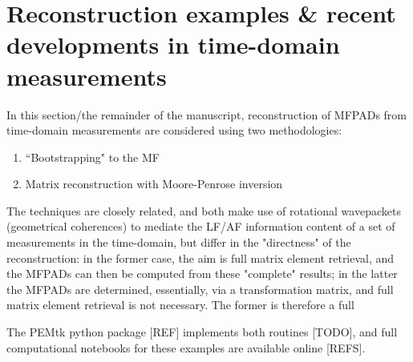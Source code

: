 \section{Reconstruction examples \& recent developments in time-domain measurements}

In this section/the remainder of the manuscript, reconstruction of MFPADs from time-domain measurements are considered using two methodologies:

\begin{enumerate}
\item ``Bootstrapping" to the MF \cite{hockett2018QMP1,hockett2018QMP2,marceau2017MolecularFrameReconstruction}
\item Matrix reconstruction with Moore-Penrose inversion \cite{gregory2021MolecularFramePhotoelectron}
\end{enumerate}

The techniques are closely related, and both make use of rotational wavepackets (geometrical coherences) to mediate the LF/AF information content of a set of measurements in the time-domain, but differ in the "directness" of the reconstruction: in the former case, the aim is full matrix element retrieval, and the MFPADs can then be computed from these "complete" results; in the latter the MFPADs are determined, essentially, via a transformation matrix, and full matrix element retrieval is not necessary. The former is therefore a full 

The PEMtk python package [REF] implements both routines [TODO], and full computational notebooks for these examples are available online [REFS].